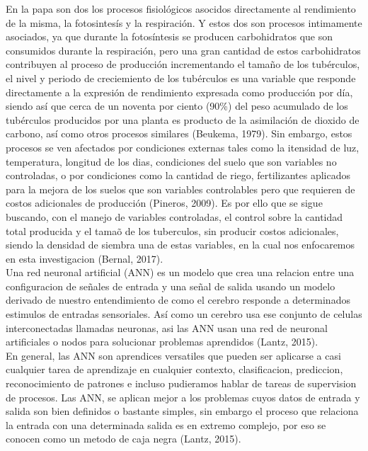 En la papa son dos los procesos fisiológicos asocidos directamente al rendimiento de la misma, la fotosintesís y la respiración. Y estos dos son procesos intimamente asociados, ya que durante la fotosíntesis se producen carbohidratos que son consumidos durante la respiración, pero una gran cantidad de estos carbohidratos contribuyen al proceso de producción incrementando el tama\~no de los tubérculos, el nivel y periodo de creciemiento de los tubérculos es una variable que responde directamente a la expresión de rendimiento expresada como producción por día, siendo así que cerca de un noventa por ciento (90\%) del peso acumulado de los tubérculos producidos por una planta es producto de la asimilación de dioxido de carbono, así como otros procesos similares (Beukema, 1979). Sin embargo, estos procesos se ven afectados por condiciones externas tales como la itensidad de luz, temperatura, longitud de los dias, condiciones del suelo que son variables no controladas, o por condiciones como la cantidad de riego, fertilizantes aplicados para la mejora de los suelos que son variables controlables pero que requieren de costos adicionales de producción (Pineros, 2009). Es por ello que se sigue buscando, con el manejo de variables controladas,  el control sobre la cantidad total producida y el tama\~o de los tuberculos,  sin producir costos adicionales, siendo la densidad de siembra una de estas variables, en la cual nos enfocaremos en esta investigacion (Bernal, 2017).\\

Una red neuronal artificial (ANN) es un modelo que crea una relacion entre una configuracion de señales de entrada y una señal de salida usando un modelo derivado de nuestro entendimiento de como el cerebro responde a determinados estimulos de entradas sensoriales. Así como un cerebro usa ese conjunto de celulas interconectadas llamadas neuronas, asi las ANN usan una red de neuronal artificiales o nodos para solucionar problemas aprendidos (Lantz, 2015).\\

En general, las ANN son aprendices versatiles que pueden ser aplicarse a casi cualquier tarea de aprendizaje en cualquier contexto, clasificacion, prediccion, reconocimiento de patrones e incluso pudieramos hablar de tareas de supervision de procesos. Las ANN, se aplican mejor a los problemas cuyos datos de entrada y salida son bien definidos o bastante simples, sin embargo el proceso que relaciona la entrada con una determinada salida es en extremo complejo, por eso se conocen como un metodo de caja negra (Lantz, 2015).\\

